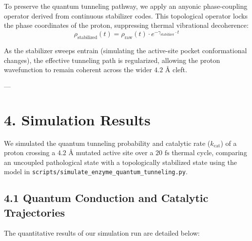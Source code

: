 \documentclass[11pt,twocolumn]{article}
\begin{document}
To preserve the quantum tunneling pathway, we apply an anyonic phase-coupling operator derived from continuous stabilizer codes. This topological operator locks the phase coordinates of the proton, suppressing thermal vibrational decoherence:
$$\rho_{\text{stabilized}}(t) = \rho_{\text{raw}}(t) \cdot e^{-\gamma_{\text{stabilizer}} \cdot t}$$

As the stabilizer sweeps entrain (simulating the active-site pocket conformational changes), the effective tunneling path is regularized, allowing the proton wavefunction to remain coherent across the wider $4.2\text{ \AA}$ cleft.

---

\section{4. Simulation Results}
We simulated the quantum tunneling probability and catalytic rate ($k_{\text{cat}}$) of a proton crossing a $4.2\text{ \AA}$ mutated active site over a $20\text{ fs}$ thermal cycle, comparing an uncoupled pathological state with a topologically stabilized state using the model in \texttt{scripts/simulate_enzyme_quantum_tunneling.py}.

\subsection{4.1 Quantum Conduction and Catalytic Trajectories}
The quantitative results of our simulation run are detailed below:
\end{document}
